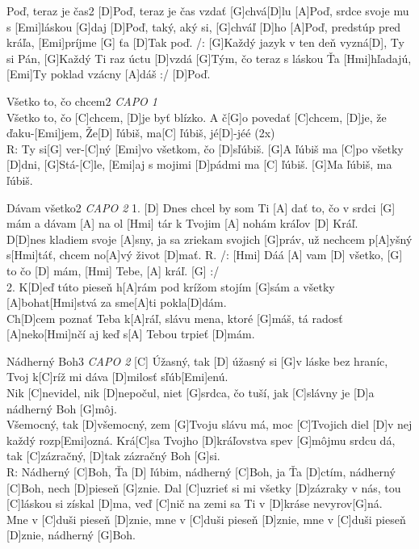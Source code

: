 \documentclass[12pt]{article}
\begin{document}
\begin{song}{Poď, teraz je čas}{2}
[D]Poď, teraz je čas vzdať [G]chvá[D]lu
[A]Poď, srdce svoje mu s [Emi]láskou [G]daj
[D]Poď, taký, aký si, [G]chváľ [D]ho
[A]Poď, predstúp pred kráľa, [Emi]príjme [G] ťa
[D]Tak poď.
\columnbreak
/: [G]Každý jazyk v ten deň vyzná[D], Ty si Pán,
[G]Každý Ti raz úctu [D]vzdá
[G]Tým, čo teraz s láskou Ťa [Hmi]hľadajú,
[Emi]Ty poklad vzácny [A]dáš :/
[D]Poď.
\end{song}


\begin{song}{Všetko to, čo chcem}{2}
	\textit{CAPO 1}\\
	[G]Všetko to, čo [C]chcem, 
	[D]je byť blízko.
	A č[G]o povedať [C]chcem, 
	[D]je, že ďaku-[Emi]jem,
	Že[D] ľúbiš, ma[C] ľúbiš, jé[D]-jéé (2x)
	\\
	R: Ty si[G] ver-[C]ný 
	[Emi]vo všetkom, čo [D]sľúbiš.
	[G]A ľúbiš ma [C]po všetky [D]dni,
	[G]Stá-[C]le, [Emi]aj s mojimi [D]pádmi ma [C] ľúbiš.
	[G]Ma ľúbiš, ma ľúbiš.
\end{song}

\begin{song}{Dávam všetko}{2}
	\textit{CAPO 2}
	1. [D] Dnes chcel by som Ti [A] dať
	to, čo v srdci [G] mám
	a dávam [A] na ol [Hmi] tár
	k Tvojim [A] nohám kráľov [D] Kráľ.
	\\
	D[D]nes kladiem svoje [A]sny,
	ja sa zriekam svojich [G]práv,
	už nechcem p[A]yšný s[Hmi]táť,
	chcem no[A]vý život [D]mať.
	\columnbreak
	R. /: [Hmi] Dáá [A] vam [D] všetko,
	[G] to čo [D] mám, [Hmi] Tebe, [A] kráľ. [G] :/
	\\
	2. K[D]eď túto pieseň h[A]rám
	pod krížom stojím [G]sám
	a všetky [A]bohat[Hmi]stvá
	za sme[A]ti pokla[D]dám.
	\\
	Ch[D]cem poznať Teba k[A]ráľ,
	slávu mena, ktoré [G]máš,
	tá radosť [A]neko[Hmi]nčí
	aj keď s[A] Tebou trpieť [D]mám.
\end{song}

\begin{song}{Nádherný Boh}{3}
	\textit{CAPO 2}
	[C] Úžasný, tak [D] úžasný
	si [G]v láske bez hraníc,
	Tvoj k[C]ríž mi dáva
	[D]milosť sľúb[Emi]enú.
	\\
	Nik [C]nevidel, nik [D]nepočul,
	niet [G]srdca, čo tuší,
	jak [C]slávny je 
	[D]a nádherný Boh [G]môj.
	\\
	[C]Všemocný, tak [D]všemocný,
	zem [G]Tvoju slávu má,
	moc [C]Tvojich diel
	[D]v nej každý rozp[Emi]ozná.
	\columnbreak
	Krá[C]sa Tvojho [D]kráľovstva
	spev [G]môjmu srdcu dá,
	tak [C]zázračný,
	[D]tak zázračný Boh [G]si.
	\\
	R:
	Nádherný [C]Boh, Ťa [D] ľúbim,
	nádherný [C]Boh, ja Ťa [D]ctím,
	nádherný [C]Boh, nech [D]pieseň 
	[G]znie.
	\columnbreak
	Dal [C]uzrieť si mi
	všetky [D]zázraky v nás,
	tou [C]láskou si získal [D]ma,
	veď [C]nič na zemi
	sa Ti v [D]kráse nevyrov[G]ná.
	\\
	Mne v [C]duši pieseň [D]znie,
	mne v [C]duši pieseň [D]znie,
	mne v [C]duši pieseň [D]znie,
	nádherný [G]Boh.
\end{song}
\end{document}
